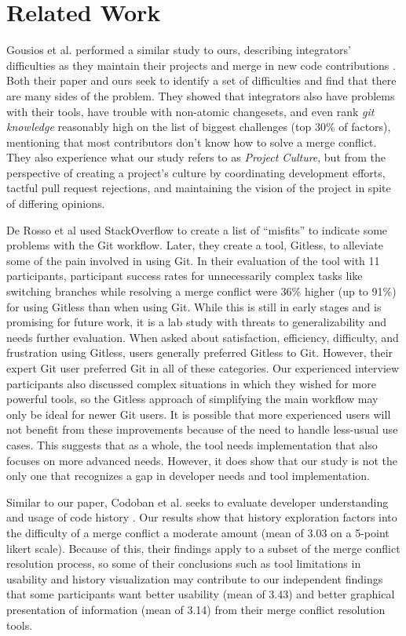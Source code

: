 \section{Related Work}\label{related_work}

Gousios et al. performed a similar study to ours, describing integrators' difficulties as they maintain their projects and merge in new code contributions \cite{integrator_perspective}. Both their paper and ours seek to identify a set of difficulties and find that there are many sides of the problem. They showed that integrators also have problems with their tools, have trouble with non-atomic changesets, and even rank \textit{git knowledge} reasonably high on the list of biggest challenges (top 30\% of factors), mentioning that most contributors don't know how to solve a merge conflict. They also experience what our study refers to as \textit{Project Culture}, but from the perspective of creating a project's culture by coordinating development efforts, tactful pull request rejections, and maintaining the vision of the project in spite of differing opinions.

De Rosso et al \cite{DeRosso2016} used StackOverflow to create a list of ``misfits'' to indicate some problems with the Git workflow. Later, they create a tool, Gitless, to alleviate some of the pain involved in using Git. In their evaluation of the tool with 11 participants, participant success rates for unnecessarily complex tasks like  switching branches while resolving a merge conflict were 36\% higher (up to 91\%) for using Gitless than when using Git. While this is still in early stages and is promising for future work, it is a lab study with threats to generalizability and needs further evaluation. 
 When asked about satisfaction, efficiency, difficulty, and frustration using Gitless, users generally preferred Gitless to Git. However, their expert Git user preferred Git in all of these categories. Our experienced interview participants also discussed complex situations in which they wished for more powerful tools, so the Gitless approach of simplifying the main workflow may only be ideal for newer Git users. It is possible that more experienced users will not benefit from these improvements because of the need to handle less-usual use cases. This suggests that as a whole, the tool needs implementation that also focuses on more advanced needs. However, it does show that our study is not the only one that recognizes a gap in developer needs and tool implementation.

Similar to our paper, Codoban et al. seeks to evaluate developer understanding and usage of code history \cite{mihai_lenses}. Our results show that history exploration factors into the difficulty of a merge conflict a moderate amount (mean of 3.03 on a 5-point likert scale). Because of this, their findings apply to a subset of the merge conflict resolution process, so some of their conclusions such as tool limitations in usability and history visualization may contribute to our independent findings that some participants want better usability (mean of 3.43) and better graphical presentation of information (mean of 3.14) from their merge conflict resolution tools.
